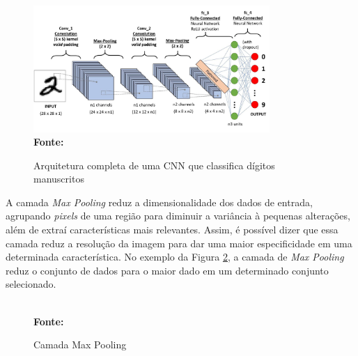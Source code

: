 \begin{figure}[ht]
 	\centering	
 	\caption[\hspace{0.1cm}Grade Computacional.]{Arquitetura completa de uma CNN que classifica dígitos manuscritos}
 	\vspace{-0.4cm}
 	\includegraphics[width=0.8\textwidth]{figuras/cnn.png}
 	\captionsetup{justification=centering}
	\vspace{-0.2cm}
     \\\textbf{\footnotesize Fonte: \cite{towardsdatascienceimage}}
	\label{fig:cnn}
\end{figure}

A camada \textit{Max Pooling} reduz a dimensionalidade dos dados de entrada, agrupando \textit{pixels} de uma região para diminuir a variância à pequenas alterações, além de extraí características mais relevantes. Assim, é possível dizer que essa camada reduz a resolução da imagem para dar uma maior especificidade em uma determinada característica. No exemplo da Figura \ref{fig:maxpooling}, a camada de \textit{Max Pooling} reduz o conjunto de dados para o maior dado em um determinado conjunto selecionado.



\begin{figure}[ht]
    \centering
    \caption[Grade Computacional.]{Camada Max Pooling}
    \vspace{-0.4cm}
    \captionsetup{justification=centering}
    \vspace{-0.2cm}
    \\\textbf{\footnotesize Fonte: \cite{cnns}}
    \label{fig:maxpooling}
\end{figure}



